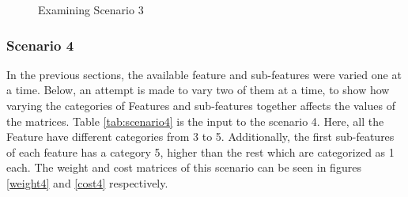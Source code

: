 \begin{figure}[htp]
  \caption{Examining Scenario 3}
  \label{fig:scenatio3}
\end{figure}

\subsubsection{Scenario 4}
In the previous sections, the available feature and sub-features were varied one at a time. Below, an attempt is made to vary two of them at a time, to show how varying the categories of Features and sub-features together affects the values of the matrices. Table \ref{tab:scenario4} is the input to the scenario 4. Here, all the Feature have different categories from 3 to 5. Additionally, the first sub-features of each feature has a category 5, higher than the rest which are categorized as 1 each. The weight and cost matrices of this scenario can be seen in figures \ref{weight4} and \ref{cost4} respectively. 


